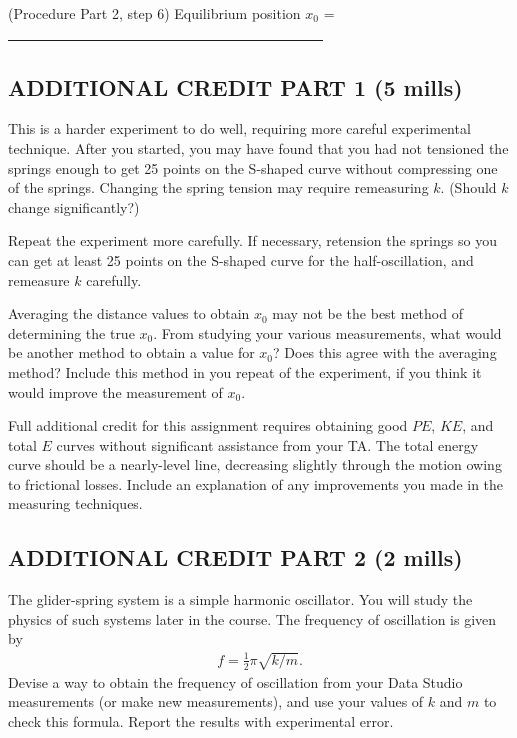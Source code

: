 \item (Procedure Part 2, step 6) Equilibrium position \(x_0\) = \ul{~~~~~~~~~~~~~~~~~~~~~~~~~~~~~~~~~~~~~~~~~~~~~}

\squishend

\subsection*{ADDITIONAL CREDIT PART 1 (5 mills)}

This is a harder experiment to do well, requiring more careful experimental technique.  After you started, you may have found that you had not tensioned the springs enough to get 25 points on the S-shaped curve without compressing one of the springs.  Changing the spring tension may require remeasuring \(k\).  (Should \(k\) change significantly?)

Repeat the experiment more carefully.  If necessary, retension the springs so you can get at least 25 points on the S-shaped curve for the half-oscillation, and remeasure \(k\) carefully.

Averaging the distance values to obtain \(x_0\) may not be the best method of determining the true \(x_0\).  From studying your various measurements, what would be another method to obtain a value for \(x_0\)?  Does this agree with the averaging method?  Include this method in you repeat of the experiment, if you think it would improve the measurement of \(x_0\).

Full additional credit for this assignment requires obtaining good \(PE\), \(KE\), and total \(E\) curves without significant assistance from your TA.  The total energy curve should be a nearly-level line, decreasing slightly through the motion owing to frictional losses.  Include an explanation of any improvements you made in the measuring techniques.

\subsection*{ADDITIONAL CREDIT PART 2 (2 mills)}

The glider-spring system is a simple harmonic oscillator.  You will study the physics of such systems later in the course.   The frequency of oscillation is given by
\begin{align} f = \frac{1}{2}\pi \sqrt{k/m}. \end{align}
Devise a way to obtain the frequency of oscillation from your Data Studio measurements (or make new measurements), and use your values of \(k\) and \(m\) to check this formula.  Report the results with experimental error.
